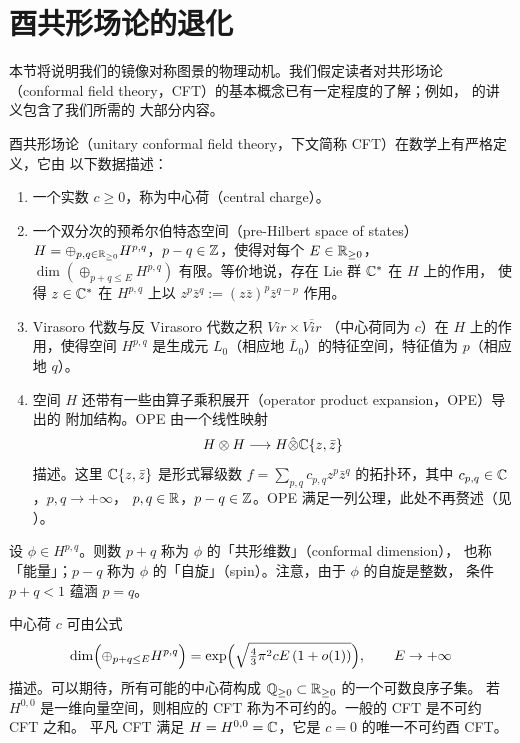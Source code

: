 \section{酉共形场论的退化}

本节将说明我们的镜像对称图景的物理动机。我们假定读者对共形场论（conformal field
theory，CFT）的基本概念已有一定程度的了解；例如，\cite{Gaw} 的讲义包含了我们所需的
大部分内容。

酉共形场论（unitary conformal field theory，下文简称 CFT）在数学上有严格定义，它由
以下数据描述：

\begin{enumerate}[label=\arabic*)]
\item 一个实数 $c\ge 0$，称为中心荷（central charge）。
\item 一个双分次的预希尔伯特态空间（pre-Hilbert space of states）
  $H=\oplus_{p,q\in\mathbb{R}_{\ge0}}H^{p,q}$，$p-q\in\mathbb{Z}$，使得对每个 $E\in\mathbb{R}_{\ge0}$，
  $\dim(\oplus_{p+q\le E}H^{p,q})$ 有限。等价地说，存在 Lie 群 $\mathbb{C}^*$ 在 $H$ 上的作用，
  使得 $z\in\mathbb{C}^*$ 在 $H^{p,q}$ 上以 $z^p\bar z^q:=(z\bar z)^p\bar z^{q-p}$ 作用。
\item Virasoro 代数与反 Virasoro 代数之积 $\mathit{Vir}\times\overline{\mathit{Vir}}$
  （中心荷同为 $c$）在 $H$ 上的作用，使得空间 $H^{p,q}$ 是生成元 $L_0$（相应地
  $\bar L_0$）的特征空间，特征值为 $p$（相应地 $q$）。
\item 空间 $H$ 还带有一些由算子乘积展开（operator product expansion，OPE）导出的
  附加结构。OPE 由一个线性映射
  \[
    H\otimes H\longrightarrow H\hat\otimes\mathbb{C}\{z,\bar z\}
  \]
  描述。这里 $\mathbb{C}\{z,\bar z\}$ 是形式幂级数
  $f=\sum_{p,q}c_{p,q}z^p\bar z^q$ 的拓扑环，其中 $c_{p,q}\in\mathbb{C}$，$p,q\to+\infty$，
  $p,q\in\mathbb{R}$，$p-q\in\mathbb{Z}$。OPE 满足一列公理，此处不再赘述（见 \cite{Gaw}）。
\end{enumerate}

设 $\phi\in H^{p,q}$。则数 $p+q$ 称为 $\phi$ 的「共形维数」（conformal dimension），
也称「能量」；$p-q$ 称为 $\phi$ 的「自旋」（spin）。注意，由于 $\phi$ 的自旋是整数，
条件 $p+q<1$ 蕴涵 $p=q$。

中心荷 $c$ 可由公式
\[
  \dim\Bigl(\oplus_{p+q\le E}H^{p,q}\Bigr)
  =\exp\Bigl(\sqrt{\tfrac{4}{3}\pi^2cE\,(1+o(1))}\Bigr),
  \qquad E\to+\infty
\]
描述。可以期待，所有可能的中心荷构成 $\mathbb{Q}_{\ge0}\subset\mathbb{R}_{\ge0}$ 的一个可数良序子集。
若 $H^{0,0}$ 是一维向量空间，则相应的 CFT 称为不可约的。一般的 CFT 是不可约 CFT 之和。
平凡 CFT 满足 $H=H^{0,0}=\mathbb{C}$，它是 $c=0$ 的唯一不可约酉 CFT。


